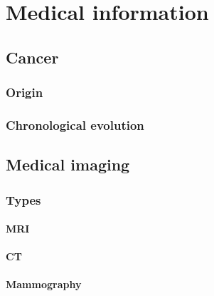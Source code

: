 
\chapter{Medical information}
\label{ch:medical}

\section{Cancer}

\subsection{Origin}

\subsection{Chronological evolution}


\section{Medical imaging}

\subsection{Types}

\subsubsection{MRI}

\subsubsection{CT}

\subsubsection{Mammography}